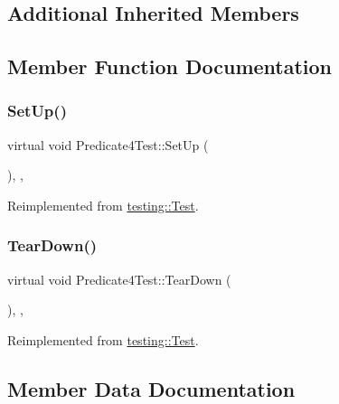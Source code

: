 \subsection*{Additional Inherited Members}


\subsection{Member Function Documentation}
\mbox{\label{classPredicate4Test_afcf9db5dc68e97291813cdfeb2aaa5d2}} 
\subsubsection{\texorpdfstring{SetUp()}{SetUp()}}
{\footnotesize\ttfamily virtual void Predicate4\+Test\+::\+Set\+Up (\begin{DoxyParamCaption}{ }\end{DoxyParamCaption})\hspace{0.3cm}{\ttfamily [inline]}, {\ttfamily [protected]}, {\ttfamily [virtual]}}



Reimplemented from \mbox{\hyperlink{classtesting_1_1Test_a190315150c303ddf801313fd1a777733}{testing\+::\+Test}}.

\mbox{\label{classPredicate4Test_ab61983a4cdf3657b02bc2b81b67729c4}} 
\subsubsection{\texorpdfstring{TearDown()}{TearDown()}}
{\footnotesize\ttfamily virtual void Predicate4\+Test\+::\+Tear\+Down (\begin{DoxyParamCaption}{ }\end{DoxyParamCaption})\hspace{0.3cm}{\ttfamily [inline]}, {\ttfamily [protected]}, {\ttfamily [virtual]}}



Reimplemented from \mbox{\hyperlink{classtesting_1_1Test_a5f0ab439802cbe0ef7552f1a9f791923}{testing\+::\+Test}}.



\subsection{Member Data Documentation}
\mbox{\label{classPredicate4Test_a20600b5eda187c42ce4e812e77269654}} 
